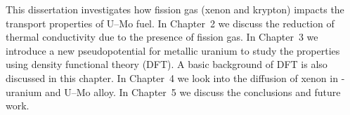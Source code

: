 
This dissertation investigates how fission gas (xenon and krypton) impacts the transport properties of U--Mo fuel. In Chapter~2 we discuss the reduction of thermal conductivity due to the presence of fission gas. In Chapter~3 we introduce a new pseudopotential for metallic uranium to study the properties using density functional theory (DFT). A basic background of DFT is also discussed in this chapter. In Chapter~4 we look into the diffusion of xenon in \textgamma-uranium and U--Mo alloy. In Chapter~5 we discuss the conclusions and future work.




















